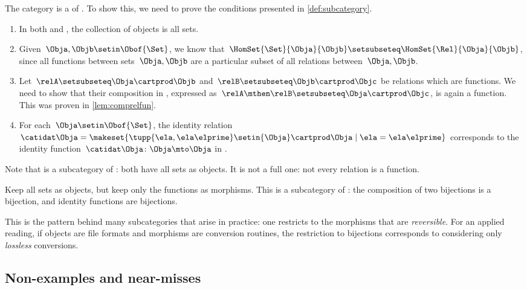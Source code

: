 \begin{example}
    The category \Set is a  of \Rel.
    To show this, we need to prove the conditions presented in \cref{def:subcategory}.
    \begin{enumerate}
        \item In both \Rel and \Set, the collection of objects is all sets.
        \item Given~$\Obja,\Objb\setin \Obof{\Set}$, we know that~$\HomSet{\Set}{\Obja}{\Objb}\setsubseteq \HomSet{\Rel}{\Obja}{\Objb}$, since all functions between sets~$\Obja,\Objb$ are a particular subset of all relations between~$\Obja,\Objb$.
        \item Let~$\relA\setsubseteq \Obja\cartprod \Objb$ and~$\relB\setsubseteq \Objb \cartprod \Objc$ be relations which are functions.
              We need to show that their composition in \Rel, expressed as~$\relA\mthen \relB\setsubseteq \Obja\cartprod \Objc$, is again a function.
              This was proven in \cref{lem:comprelfun}.
        \item For each~$\Obja \setin \Obof{\Set}$, the identity relation~$\catidat\Obja=\makeset{\tupp{\ela,\ela\elprime}\setin {\Obja} \cartprod \Obja \mid \ela=\ela\elprime}$ corresponds to the identity function~$\catidat\Obja \colon \Obja \mto \Obja$ in \Set.
    \end{enumerate}
    Note that \Set is a  subcategory of \Rel: both have all sets as objects.
    It is not a full one: not every relation is a function.
\end{example}

\begin{example}
    \label{exa:bijections-wide-subcategory}
    Keep all sets as objects, but keep only the  functions as morphisms.
    This is a  subcategory of \Set: the composition of two bijections is a bijection, and identity functions are bijections.

    This is the pattern behind many subcategories that arise in practice: one restricts to the morphisms that are \emph{reversible}.
    For an applied reading, if objects are file formats and morphisms are conversion routines, the restriction to bijections corresponds to considering only \emph{lossless} conversions.
\end{example}

\subsection{Non-examples and near-misses}

